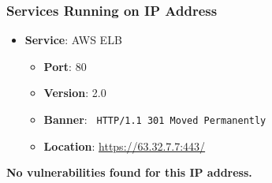 \documentclass{article}
\begin{document}
\subsubsection*{Services Running on IP Address}

\begin{itemize}
    
        \item \textbf{Service}: AWS ELB
        \begin{itemize}
            \item \textbf{Port}: 80
            \item \textbf{Version}:  2.0 
            \item \textbf{Banner}: \texttt{ HTTP/1.1 301 Moved Permanently
 }
            \item \textbf{Location}: \href{ https://63.32.7.7:443/ }{ https://63.32.7.7:443/ }
        \end{itemize}
    
\end{itemize}


\textbf{No vulnerabilities found for this IP address.}


\clearpage
\end{document}

